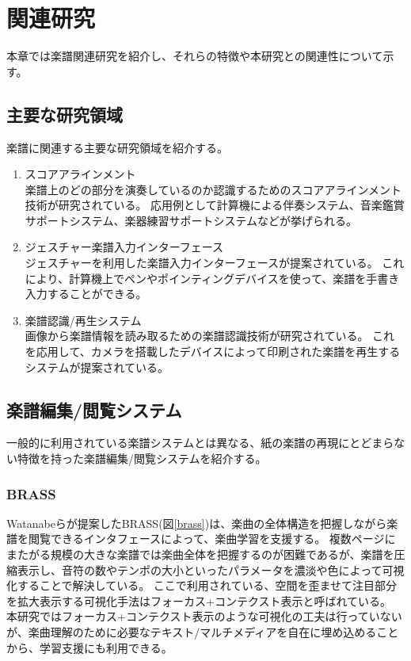 \chapter{関連研究}
\label{chap:kanren}

本章では楽譜関連研究を紹介し、それらの特徴や本研究との関連性について示す。

\newpage

\section{主要な研究領域}
楽譜に関連する主要な研究領域を紹介する。

\begin{enumerate}
  \item スコアアラインメント\\
  楽譜上のどの部分を演奏しているのか認識するためのスコアアラインメント技術が研究されている\cite{online}\cite{learning}\cite{coupled}\cite{automatic}。
  応用例として計算機による伴奏システム\cite{muens}\cite{mysong}、音楽鑑賞サポートシステム\cite{orchestra}、楽器練習サポートシステムなどが挙げられる\cite{tutor}。
  \item ジェスチャー楽譜入力インターフェース\\
  ジェスチャーを利用した楽譜入力インターフェースが提案されている\cite{notepad}\cite{pen}\cite{sssp}。
  これにより、計算機上でペンやポインティングデバイスを使って、楽譜を手書き入力することができる。
  \item 楽譜認識/再生システム\\
  画像から楽譜情報を読み取るための楽譜認識技術が研究されている\cite{optical}\cite{early}\cite{symbol}。
  これを応用して、カメラを搭載したデバイスによって印刷された楽譜を再生するシステムが提案されている\cite{onnote}\cite{gocen}。
\end{enumerate}

\section{楽譜編集/閲覧システム}
一般的に利用されている楽譜システムとは異なる、紙の楽譜の再現にとどまらない特徴を持った楽譜編集/閲覧システムを紹介する。

\subsection{BRASS}
Watanabeらが提案したBRASS\cite{Watanabe}(図\ref{brass})は、楽曲の全体構造を把握しながら楽譜を閲覧できるインタフェースによって、楽曲学習を支援する。
複数ページにまたがる規模の大きな楽譜では楽曲全体を把握するのが困難であるが、楽譜を圧縮表示し、音符の数やテンポの大小といったパラメータを濃淡や色によって可視化することで解決している。
ここで利用されている、空間を歪ませて注目部分を拡大表示する可視化手法はフォーカス+コンテクスト表示と呼ばれている。
本研究ではフォーカス+コンテクスト表示のような可視化の工夫は行っていないが、楽曲理解のために必要なテキスト/マルチメディアを自在に埋め込めることから、学習支援にも利用できる。


